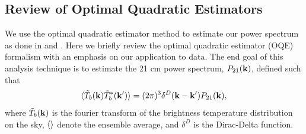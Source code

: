 \documentclass[twocolumn,numberedappendix]{emulateapj} \shorttitle{PSA64}
\begin{document}
%
%
\subsection{Review of Optimal Quadratic Estimators}
We use the optimal quadratic estimator method to estimate our power spectrum as
done in \cite{dillon_et_al2013a} and \cite{liu_tegmark2011}.  Here we briefly review the
optimal quadratic estimator (OQE) formalism with an emphasis on our application
to data. The end goal of this analysis technique is to estimate the 21 cm
power spectrum, $P_{21}(\mathbf{k})$, defined such that 
\begin{equation}
\label{eqn:pspec_def}
    \expval{\tilde{T}_{b}(\k)\tilde{T}^{*}_{b}(\k^{\prime})} =
            (2\pi)^{3}\delta^{D}(\k - \k^{\prime})P_{21}(\k),
\end{equation}
where $\tilde{T}_{b}(\mathbf{k})$ is the fourier transform of the brightness temperature
distribution on the sky, $\langle  \rangle$ denote the ensemble average, and
$\delta^{D}$ is the Dirac-Delta function. 
\end{document}
